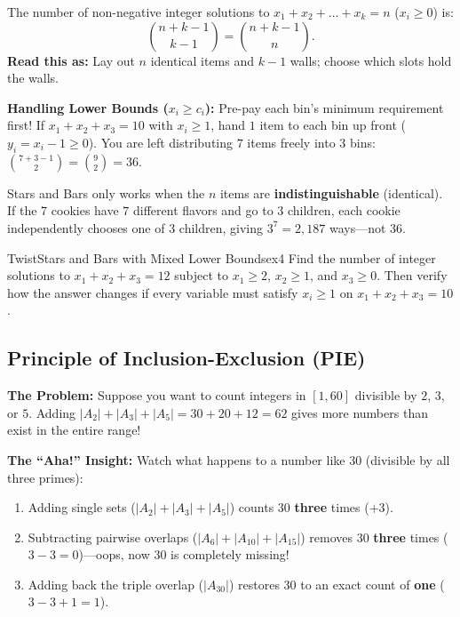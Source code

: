 \documentclass[11pt,a4paper]{article}
\theoremstyle{definition}
\newcommand{\painbeat}{\textbf{\color{accentamber}The Problem:} }
\newcommand{\ahabeat}{\textbf{\color{accentteal}The ``Aha!'' Insight:} }
\begin{document}
\begin{formulabox}
The number of non-negative integer solutions to $x_1 + x_2 + \dots + x_k = n$ ($x_i \ge 0$) is:
\[
    \binom{n + k - 1}{k - 1} = \binom{n + k - 1}{n}.
\]
\textbf{Read this as:} Lay out $n$ identical items and $k - 1$ walls; choose which slots hold the walls.
\end{formulabox}

\noindent\textbf{Handling Lower Bounds ($x_i \ge c_i$):} Pre-pay each bin's minimum requirement first! If $x_1 + x_2 + x_3 = 10$ with $x_i \ge 1$, hand $1$ item to each bin up front ($y_i = x_i - 1 \ge 0$). You are left distributing $7$ items freely into $3$ bins: $\binom{7 + 3 - 1}{2} = \binom{9}{2} = 36$.

\begin{watchoutbox}
Stars and Bars only works when the $n$ items are \textbf{indistinguishable} (identical). If the $7$ cookies have $7$ different flavors and go to $3$ children, each cookie independently chooses one of $3$ children, giving $3^7 = 2{,}187$ ways---not $36$.
\end{watchoutbox}

\begin{tryitbox}{Twist}{Stars and Bars with Mixed Lower Bounds}{ex4}
Find the number of integer solutions to $x_1 + x_2 + x_3 = 12$ subject to $x_1 \ge 2$, $x_2 \ge 1$, and $x_3 \ge 0$. Then verify how the answer changes if every variable must satisfy $x_i \ge 1$ on $x_1 + x_2 + x_3 = 10$.
\end{tryitbox}

\subsection{Principle of Inclusion-Exclusion (PIE)}

\painbeat Suppose you want to count integers in $[1, 60]$ divisible by $2$, $3$, or $5$. Adding $|A_2| + |A_3| + |A_5| = 30 + 20 + 12 = 62$ gives more numbers than exist in the entire range!

\ahabeat Watch what happens to a number like $30$ (divisible by all three primes):
\begin{enumerate}
    \item Adding single sets ($|A_2| + |A_3| + |A_5|$) counts $30$ \textbf{three} times ($+3$).
    \item Subtracting pairwise overlaps ($|A_6| + |A_{10}| + |A_{15}|$) removes $30$ \textbf{three} times ($3 - 3 = 0$)---oops, now $30$ is completely missing!
    \item Adding back the triple overlap ($|A_{30}|$) restores $30$ to an exact count of \textbf{one} ($3 - 3 + 1 = 1$).
\end{enumerate}
\end{document}
